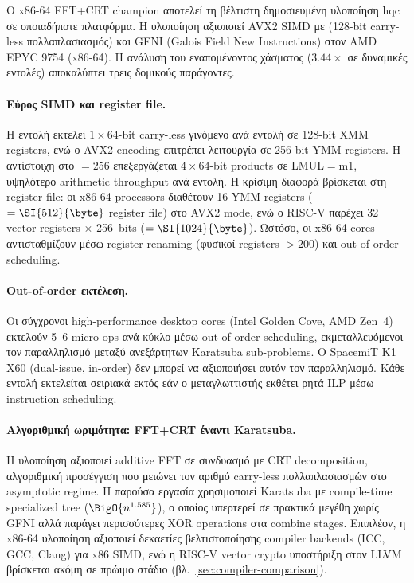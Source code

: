 Ο x86-64 FFT+CRT champion \cite{Chen2026-TCHES-HQC-FFT} αποτελεί τη βέλτιστη
δημοσιευμένη υλοποίηση \gls{hqc} σε οποιαδήποτε πλατφόρμα. Η υλοποίηση
αξιοποιεί AVX2 SIMD με  (128-bit carry-less πολλαπλασιασμός) και
GFNI (Galois Field New Instructions) στον AMD EPYC 9754 (x86-64).
Η ανάλυση του εναπομένοντος χάσματος ($3.44\times$ σε δυναμικές
εντολές) αποκαλύπτει τρεις δομικούς παράγοντες.

\paragraph{Εύρος SIMD και register file.}
Η εντολή  εκτελεί $1 \times 64$-bit carry-less γινόμενο ανά
εντολή σε 128-bit XMM registers, ενώ ο AVX2 encoding επιτρέπει λειτουργία
σε 256-bit YMM registers. Η αντίστοιχη \vclmul στο
\VLEN$= \num{256}$ επεξεργάζεται $4 \times 64$-bit products σε LMUL$=$m1,
υψηλότερο arithmetic throughput ανά εντολή. Η κρίσιμη διαφορά βρίσκεται
στη register file: οι x86-64 processors διαθέτουν 16 YMM registers
($= \SI{512}{\byte}$ register file) στο AVX2 mode, ενώ ο RISC-V παρέχει
32 vector registers $\times$ \SI{256}{bits} ($= \SI{1024}{\byte}$).
Ωστόσο, οι x86-64 cores αντισταθμίζουν μέσω register renaming
(φυσικοί registers $> 200$) και out-of-order scheduling.

\paragraph{Out-of-order εκτέλεση.}
Οι σύγχρονοι high-performance desktop cores (Intel Golden Cove, AMD Zen~4) εκτελούν 5–6 micro-ops ανά
κύκλο μέσω out-of-order scheduling, εκμεταλλευόμενοι τον παραλληλισμό
μεταξύ ανεξάρτητων Karatsuba sub-problems. Ο SpacemiT K1 X60 (dual-issue,
in-order) δεν μπορεί να αξιοποιήσει αυτόν τον παραλληλισμό. Κάθε εντολή
εκτελείται σειριακά εκτός εάν ο μεταγλωττιστής εκθέτει ρητά ILP μέσω instruction
scheduling.

\paragraph{Αλγοριθμική ωριμότητα: FFT+CRT έναντι Karatsuba.}
Η υλοποίηση \cite{Chen2026-TCHES-HQC-FFT} αξιοποιεί additive FFT σε
συνδυασμό με CRT decomposition, αλγοριθμική προσέγγιση που μειώνει τον
αριθμό carry-less πολλαπλασιασμών στο asymptotic regime. Η παρούσα εργασία
χρησιμοποιεί Karatsuba με compile-time specialized tree ($\BigO{n^{1.585}}$), ο οποίος υπερτερεί σε
πρακτικά μεγέθη χωρίς GFNI αλλά παράγει περισσότερες XOR operations στα
combine stages. Επιπλέον, η x86-64 υλοποίηση αξιοποιεί δεκαετίες
βελτιστοποίησης compiler backends (ICC, GCC, Clang) για x86 SIMD, ενώ η
RISC-V vector crypto υποστήριξη στον LLVM βρίσκεται ακόμη σε πρώιμο στάδιο
(βλ.\ \cref{sec:compiler-comparison}).

